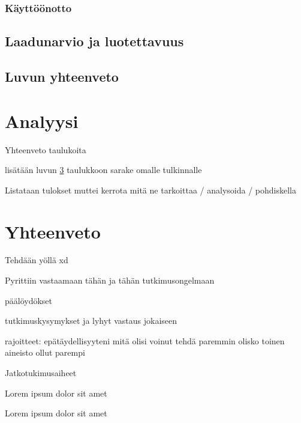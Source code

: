 \documentclass[bscthesis,finnish,oneside,biblatex]{uefcsthesis}
\begin{document}
\subsection{Käyttöönotto}

\section{Laadunarvio ja luotettavuus}

\section{Luvun yhteenveto}

\chapter{Analyysi}
\label{cha:analyysi}

Yhteenveto taulukoita

lisätään luvun \ref{cha:analyysi} taulukkoon sarake omalle tulkinnalle

Listataan tulokset muttei kerrota mitä ne tarkoittaa / analysoida / pohdiskella


\chapter{Yhteenveto}
\label{cha:yhteenveto}

Tehdään yöllä xd

Pyrittiin vastaamaan tähän ja tähän tutkimusongelmaan

päälöydökset

tutkimuskysymykset ja lyhyt vastaus jokaiseen

rajoitteet:
epätäydellisyyteni
mitä olisi voinut tehdä paremmin
olisko toinen aineisto ollut parempi

Jatkotukimusaiheet

Lorem ipsum dolor sit amet\citep{zafari2019survey}

\citet{zafari2019survey} Lorem ipsum dolor sit amet

\printbibliography[heading=bibintoc]

\backmatter %
\end{document}
